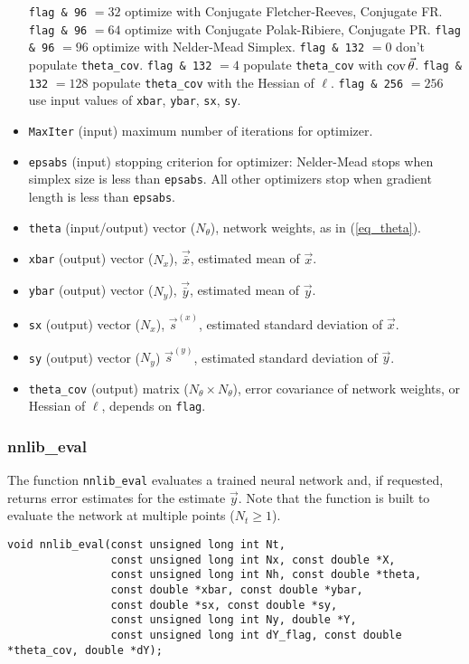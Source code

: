 \documentclass{article}    %
\newcommand{\cov}{\mathop{{\rm cov}}}
\begin{document}
\begin{itemize}
  \subitem \verb|flag & 96| $=32$ optimize with Conjugate Fletcher-Reeves, Conjugate FR.
  \subitem \verb|flag & 96| $=64$ optimize with Conjugate Polak-Ribiere, Conjugate PR.
  \subitem \verb|flag & 96| $=96$ optimize with Nelder-Mead Simplex.
  \subitem \verb|flag & 132| $=0$ don't populate \verb|theta_cov|.
  \subitem \verb|flag & 132| $=4$ populate \verb|theta_cov| with $\cov\vec\theta$.
  \subitem \verb|flag & 132| $=128$ populate \verb|theta_cov| with the Hessian of $\ell$.
  \subitem \verb|flag & 256| $=256$ use input values of \verb|xbar|, \verb|ybar|, \verb|sx|, \verb|sy|.
\item \verb|MaxIter| (input) maximum number of iterations for optimizer.
\item \verb|epsabs| (input) stopping criterion for optimizer:
\subitem Nelder-Mead stops when simplex size is less than \verb|epsabs|.
\subitem All other optimizers stop when gradient length is less than \verb|epsabs|.
\item \verb|theta| (input/output) vector ($N_{\theta}$), network weights, as in (\ref{eq_theta}).
\item \verb|xbar| (output) vector ($N_x$), $\vec{\bar{x}}$, estimated mean of $\vec{x}$.
\item \verb|ybar| (output) vector ($N_y$), $\vec{\bar{y}}$, estimated mean of $\vec{y}$.
\item \verb|sx| (output) vector ($N_x$), $\vec{s}^{(x)}$, estimated standard deviation of $\vec{x}$.
\item \verb|sy| (output) vector ($N_y$) $\vec{s}^{(y)}$, estimated standard deviation of $\vec{y}$.
\item \verb|theta_cov| (output) matrix ($N_{\theta} \times N_{\theta}$), error
  covariance of network weights, or Hessian of $\ell$, depends on \verb|flag|. 
\end{itemize}

\subsubsection{nnlib\_eval}

The function \verb|nnlib_eval| evaluates a trained neural network and,
if requested, returns error estimates for the estimate $\vec{y}$. Note
that the function is built to evaluate the network at multiple points
($N_t \ge 1$).

\begin{verbatim}
void nnlib_eval(const unsigned long int Nt,
                const unsigned long int Nx, const double *X, 
                const unsigned long int Nh, const double *theta, 
                const double *xbar, const double *ybar,
                const double *sx, const double *sy,
                const unsigned long int Ny, double *Y, 
                const unsigned long int dY_flag, const double *theta_cov, double *dY);
\end{verbatim}
\end{document}
